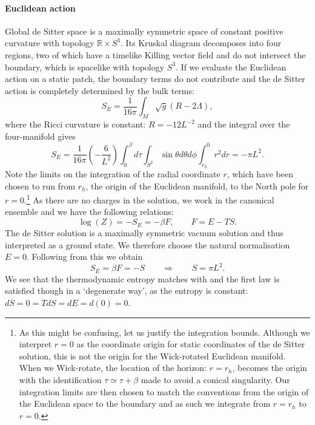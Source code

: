 \paragraph{Euclidean action}
Global de Sitter space is a maximally symmetric space of constant positive curvature with topology $\mathbb{R} \times S^3$. Its Kruskal diagram decomposes into four regions, two of which have a timelike Killing vector field and do not intersect the boundary, which is spacelike with topology $S^3$. If we evaluate the Euclidean action on a static patch, the boundary terms do not contribute and the de Sitter action is completely determined by the bulk terms: 
\begin{equation*}
    S_E = \frac{1}{16\pi} \int_{M} \sqrt{g}(R - 2\Lambda),
\end{equation*}
where the Ricci curvature is constant: $R = -12 L^{-2}$ and the integral over the four-manifold gives
\begin{equation*}
    S_E = \frac{1}{16\pi} \left(-\frac{6}{L^2}\right) \int_0^\beta d\tau \int_{S^2} \sin\theta d\theta d\phi \int_{r_h}^0 r^2 dr = -\pi L^2.
\end{equation*}
Note the limits on the integration of the radial coordinate $r$, which have been chosen to run from $r_h$, the origin of the Euclidean manifold, to the North pole for $r = 0$.\footnote{As this might be confusing, let us justify the integration bounds. Although we interpret $r = 0$ as the coordinate origin for static coordinates of the de Sitter solution, this is not the origin for the Wick-rotated Euclidean manifold. When we Wick-rotate, the location of the horizon: $r = r_h$, becomes the origin with the identification $\tau \simeq \tau + \beta$ made to avoid a conical singularity. Our integration limits are then chosen to match the conventions from the origin of the Euclidean space to the boundary and as such we integrate from $r = r_h$ to $r = 0$.} As there are no charges in the solution, we work in the canonical ensemble and we have the following relations:
\begin{equation*}
    \log(Z) = -S_E = -\beta F, \qquad F = E - T S .
\end{equation*}
The de Sitter solution is a maximally symmetric vacuum solution and thus interpreted as a ground state.  We therefore choose the natural normalisation $E=0$. Following from this we obtain
\begin{equation*}
    S_E = \beta F = - S \qquad \Rightarrow \qquad S = \pi L^2.
\end{equation*}
We see that the thermodynamic entropy matches with  and the first law is satisfied though in a `degenerate way', as the entropy is constant: $dS = 0 = TdS = dE = d(0) = 0$. 

